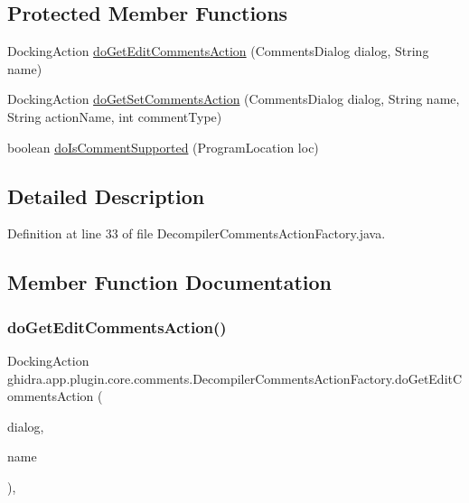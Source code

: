 \subsection*{Protected Member Functions}
\begin{DoxyCompactItemize}
\item 
Docking\+Action \mbox{\hyperlink{classghidra_1_1app_1_1plugin_1_1core_1_1comments_1_1_decompiler_comments_action_factory_ad04255ea231488790ab5ee6034f425fd}{do\+Get\+Edit\+Comments\+Action}} (Comments\+Dialog dialog, String name)
\item 
Docking\+Action \mbox{\hyperlink{classghidra_1_1app_1_1plugin_1_1core_1_1comments_1_1_decompiler_comments_action_factory_a0377b737840611d291d0b41f977b6e91}{do\+Get\+Set\+Comments\+Action}} (Comments\+Dialog dialog, String name, String action\+Name, int comment\+Type)
\item 
boolean \mbox{\hyperlink{classghidra_1_1app_1_1plugin_1_1core_1_1comments_1_1_decompiler_comments_action_factory_a26cd6daea8542ec7f83490a6156f0531}{do\+Is\+Comment\+Supported}} (Program\+Location loc)
\end{DoxyCompactItemize}


\subsection{Detailed Description}


Definition at line 33 of file Decompiler\+Comments\+Action\+Factory.\+java.



\subsection{Member Function Documentation}
\mbox{\label{classghidra_1_1app_1_1plugin_1_1core_1_1comments_1_1_decompiler_comments_action_factory_ad04255ea231488790ab5ee6034f425fd}} 
\subsubsection{\texorpdfstring{doGetEditCommentsAction()}{doGetEditCommentsAction()}}
{\footnotesize\ttfamily Docking\+Action ghidra.\+app.\+plugin.\+core.\+comments.\+Decompiler\+Comments\+Action\+Factory.\+do\+Get\+Edit\+Comments\+Action (\begin{DoxyParamCaption}\item[{Comments\+Dialog}]{dialog,  }\item[{String}]{name }\end{DoxyParamCaption})\hspace{0.3cm}{\ttfamily [inline]}, {\ttfamily [protected]}}




